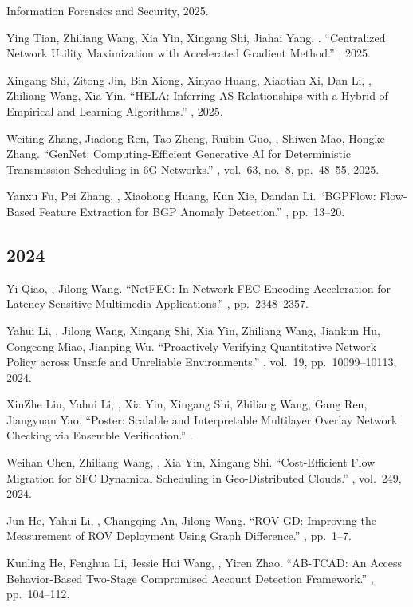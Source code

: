 \documentclass[11pt]{article}
\begin{document}
\begin{publist}
{Information Forensics and Security}, 2025.
\item Ying Tian, Zhiliang Wang\corr, Xia Yin, Xingang Shi, Jiahai Yang, \corr. ``Centralized Network Utility Maximization with Accelerated Gradient
Method.'' , 2025.
\item Xingang Shi, Zitong Jin\corr, Bin Xiong, Xinyao Huang, Xiaotian Xi, Dan Li,
, Zhiliang Wang, Xia Yin. ``HELA: Inferring AS Relationships with a
Hybrid of Empirical and Learning Algorithms.'' , 2025.
\item Weiting Zhang, Jiadong Ren, Tao Zheng, Ruibin Guo, , Shiwen Mao,
Hongke Zhang\corr. ``GenNet: Computing-Efficient Generative AI for Deterministic
Transmission Scheduling in 6G Networks.'' ,
vol.~63, no.~8, pp.~48--55, 2025.
\item Yanxu Fu, Pei Zhang\corr, , Xiaohong Huang, Kun Xie, Dandan Li.
``BGPFlow: Flow-Based Feature Extraction for BGP Anomaly Detection.''
, pp.~13--20.
\end{publist}

\subsection*{2024}
\begin{publist}
\item Yi Qiao, \corr, Jilong Wang. ``NetFEC: In-Network FEC Encoding
Acceleration for Latency-Sensitive Multimedia Applications.''
, pp.~2348--2357.
\item Yahui Li, \corr, Jilong Wang, Xingang Shi, Xia Yin, Zhiliang Wang,
Jiankun Hu, Congcong Miao, Jianping Wu. ``Proactively Verifying Quantitative Network
Policy across Unsafe and Unreliable Environments.'' , vol.~19, pp.~10099--10113, 2024.
\item XinZhe Liu, Yahui Li\corr, , Xia Yin, Xingang Shi, Zhiliang Wang,
Gang Ren, Jiangyuan Yao. ``Poster: Scalable and Interpretable Multilayer Overlay
Network Checking via Ensemble Verification.'' .
\item Weihan Chen, Zhiliang Wang\corr, , Xia Yin, Xingang Shi.
``Cost-Efficient Flow Migration for SFC Dynamical Scheduling in Geo-Distributed
Clouds.'' , vol.~249, 2024.
\item Jun He, Yahui Li\corr, \corr, Changqing An, Jilong Wang. ``ROV-GD:
Improving the Measurement of ROV Deployment Using Graph Difference.''
, pp.~1--7.
\item Kunling He, Fenghua Li, Jessie Hui Wang, , Yiren Zhao. ``AB-TCAD:
An Access Behavior-Based Two-Stage Compromised Account Detection Framework.''
, pp.~104--112.
\end{publist}
\end{document}
